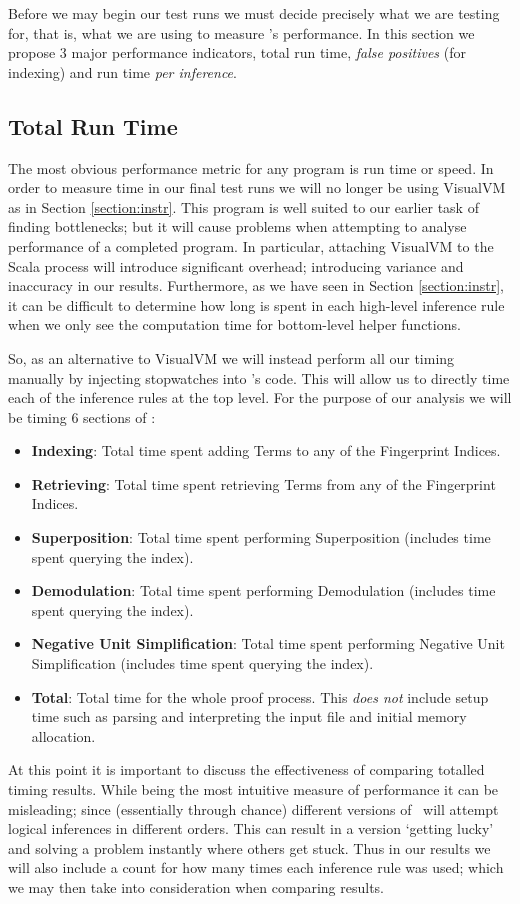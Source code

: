 Before we may begin our test runs we must decide precisely what we are testing for, that is,
what we are using to measure \beagle's performance. In this section
we propose 3 major performance indicators, total run time, \emph{false positives} (for indexing)
and run time \emph{per inference}.

\subsection{Total Run Time}
\label{sec:runtime}

The most obvious performance metric for any program is run time or speed.
In order to measure time in our final test runs 
we will no longer be using VisualVM as in Section \ref{section:instr}. This program is well suited to our earlier task
of finding bottlenecks; but it will cause problems when attempting to analyse performance of a completed program.
In particular, attaching VisualVM to the Scala process will introduce significant overhead;
introducing variance and inaccuracy in our results. Furthermore, as we have seen in Section \ref{section:instr},
it can be difficult to determine how long is spent in each high-level inference rule
when we only see the computation time for bottom-level helper functions.

So, as an alternative to VisualVM we will instead perform all our timing manually
by injecting stopwatches into \beagle's code. This will allow us to directly
time each of the inference rules at the top level. For the purpose of our analysis
we will be timing 6 sections of \beagle:
\begin{itemize}
\item \textbf{Indexing}: Total time spent adding Terms to any of the Fingerprint Indices.
\item \textbf{Retrieving}: Total time spent retrieving Terms from any of the Fingerprint Indices.
\item \textbf{Superposition}: Total time spent performing Superposition (includes time spent
querying the index).
\item \textbf{Demodulation}: Total time spent performing Demodulation (includes time spent
querying the index).
\item \textbf{Negative Unit Simplification}: Total time spent performing Negative Unit Simplification (includes time spent
querying the index).
\item \textbf{Total}: Total time for the whole proof process. This \emph{does not} include
setup time such as parsing and interpreting the input file and initial memory allocation.
\end{itemize}
At this point it is important to discuss the effectiveness of comparing totalled timing
results. While being the most intuitive measure of performance it can be misleading;
since (essentially through chance) different versions of \beagle\ will attempt logical
inferences in different orders. This can result in a version `getting lucky' and solving
a problem instantly where others get stuck. Thus in our results we will also include
a count for how many times each inference rule was used; which we may then take
into consideration when comparing results.

